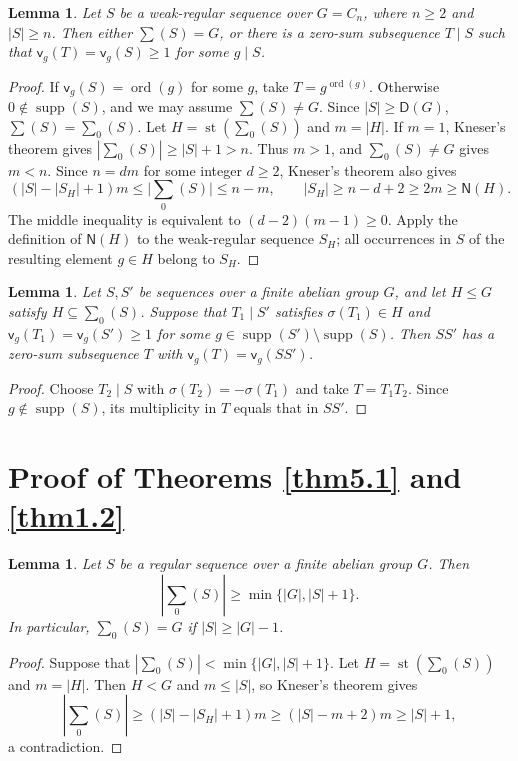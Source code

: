 \documentclass[10pt,reqno]{amsart}
\newtheorem{lem}[thm]{Lemma}
\theoremstyle{definition}
\theoremstyle{remark}
\numberwithin{equation}{section}
\DeclareMathOperator{\ord}{ord}
\DeclareMathOperator{\supp}{supp}
\DeclareMathOperator{\st}{st}
\begin{document}
\begin{lem}\label{lem2.8}
Let $S$ be a weak-regular sequence over $G=C_n$, where $n\ge2$ and $|S|\ge n$.
Then either $\sum(S)=G$, or there is a zero-sum subsequence $T\mid S$
such that $\mathsf{v}_g(T)=\mathsf{v}_g(S)\ge1$ for some $g\mid S$.
\end{lem}
\begin{proof}
If $\mathsf{v}_g(S)=\ord(g)$ for some $g$, take $T=g^{\ord(g)}$.
Otherwise $0\notin\supp(S)$, and we may assume $\sum(S)\ne G$.
Since $|S|\ge \mathsf D(G)$, $\sum(S)=\sum_0(S)$.
Let $H=\st(\sum_0(S))$ and $m=|H|$.
If $m=1$, Kneser's theorem gives $|\sum_0(S)|\ge|S|+1>n$.
Thus $m>1$, and $\sum_0(S)\ne G$ gives $m<n$.
Since $n=dm$ for some integer $d\ge2$, Kneser's theorem also gives
\[
(|S|-|S_H|+1)m\le\bigl|\sum_0(S)\bigr|\le n-m,
\qquad
|S_H|\ge n-d+2\ge2m\ge\mathsf{N}(H).
\]
The middle inequality is equivalent to $(d-2)(m-1)\ge0$.
Apply the definition of $\mathsf{N}(H)$ to the weak-regular sequence $S_H$;
all occurrences in $S$ of the resulting element $g\in H$ belong to $S_H$.
\end{proof}

\begin{lem}\label{lem2.9}
Let $S,S'$ be sequences over a finite abelian group $G$, and let
$H\le G$ satisfy $H\subseteq\sum_0(S)$.
Suppose that $T_1\mid S'$ satisfies $\sigma(T_1)\in H$ and
$\mathsf{v}_g(T_1)=\mathsf{v}_g(S')\ge1$ for some
$g\in\supp(S')\setminus\supp(S)$.
Then $SS'$ has a zero-sum subsequence $T$ with
$\mathsf{v}_g(T)=\mathsf{v}_g(SS')$.
\end{lem}
\begin{proof}
Choose $T_2\mid S$ with $\sigma(T_2)=-\sigma(T_1)$ and take $T=T_1T_2$.
Since $g\notin\supp(S)$, its multiplicity in $T$ equals that in $SS'$.
\end{proof}

\section{Proof of Theorems \ref{thm5.1} and \ref{thm1.2}}

\begin{lem}\label{lem:c0-regular-sums}
Let $S$ be a regular sequence over a finite abelian group $G$. Then
\[
|\sum_0(S)|\ge \min\{|G|,|S|+1\}.
\]
In particular, $\sum_0(S)=G$ if $|S|\ge |G|-1$.
\end{lem}

\begin{proof}
Suppose that $|\sum_0(S)|<\min\{|G|,|S|+1\}$.
Let $H=\st(\sum_0(S))$ and $m=|H|$.
Then $H<G$ and $m\le |S|$, so Kneser's theorem gives
\[
|\sum_0(S)|\ge (|S|-|S_H|+1)m
\ge (|S|-m+2)m\ge |S|+1,
\]
a contradiction.
\end{proof}
\end{document}
